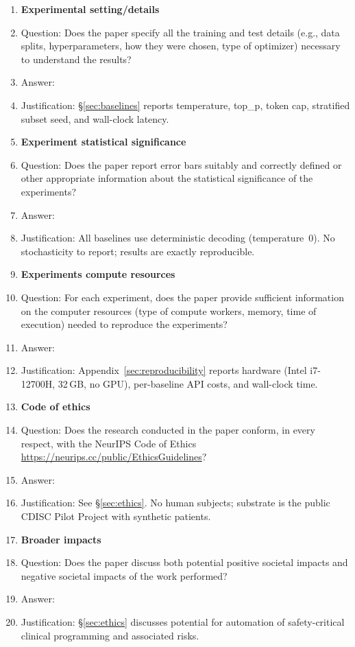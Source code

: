 \begin{enumerate}
\item {\bf Experimental setting/details}
    \item[] Question: Does the paper specify all the training and test details (e.g., data splits, hyperparameters, how they were chosen, type of optimizer) necessary to understand the results?
    \item[] Answer: \answerYes{}
    \item[] Justification: \S\ref{sec:baselines} reports temperature, top\_p, token cap, stratified subset seed, and wall-clock latency.

\item {\bf Experiment statistical significance}
    \item[] Question: Does the paper report error bars suitably and correctly defined or other appropriate information about the statistical significance of the experiments?
    \item[] Answer: \answerNo{}
    \item[] Justification: All baselines use deterministic decoding (temperature~0). No stochasticity to report; results are exactly reproducible.

\item {\bf Experiments compute resources}
    \item[] Question: For each experiment, does the paper provide sufficient information on the computer resources (type of compute workers, memory, time of execution) needed to reproduce the experiments?
    \item[] Answer: \answerYes{}
    \item[] Justification: Appendix~\ref{sec:reproducibility} reports hardware (Intel i7-12700H, 32\,GB, no GPU), per-baseline API costs, and wall-clock time.

\item {\bf Code of ethics}
    \item[] Question: Does the research conducted in the paper conform, in every respect, with the NeurIPS Code of Ethics \url{https://neurips.cc/public/EthicsGuidelines}?
    \item[] Answer: \answerYes{}
    \item[] Justification: See \S\ref{sec:ethics}. No human subjects; substrate is the public CDISC Pilot Project with synthetic patients.

\item {\bf Broader impacts}
    \item[] Question: Does the paper discuss both potential positive societal impacts and negative societal impacts of the work performed?
    \item[] Answer: \answerYes{}
    \item[] Justification: \S\ref{sec:ethics} discusses potential for automation of safety-critical clinical programming and associated risks.


\end{enumerate}
